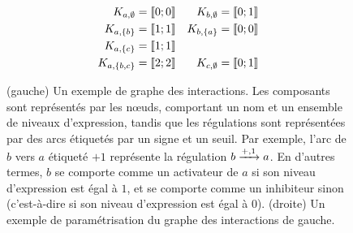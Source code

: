 \begin{figure}[ht]
  \begin{minipage}{0.5\textwidth}
  \centering
  \end{minipage}
  \begin{minipage}{0.5\textwidth}
  \centering
  \begin{align*}
    K_{a,\emptyset} &= \mathopen{\llbracket}0\mathclose{};0\mathclose{\rrbracket} & K_{b,\emptyset} &= \mathopen{\llbracket}0\mathclose{};1\mathclose{\rrbracket} \\
    K_{a,\{b\}} &= \mathopen{\llbracket}1\mathclose{};1\mathclose{\rrbracket} & K_{b,\{a\}} &= \mathopen{\llbracket}0\mathclose{};0\mathclose{\rrbracket} \\
    K_{a,\{c\}} &= \mathopen{\llbracket}1\mathclose{};1\mathclose{\rrbracket} &&\\
    K_{a,\{b,c\}} &= \mathopen{\llbracket}2\mathclose{};2\mathclose{\rrbracket} & K_{c,\emptyset} &= \mathopen{\llbracket}0\mathclose{};1\mathclose{\rrbracket}
  \end{align*}
  \end{minipage}
  \caption{%
    (gauche)
      Un exemple de graphe des interactions.
      Les composants sont représentés par les nœuds, comportant un nom et un
      ensemble de niveaux d'expression,
      tandis que les régulations sont représentées par des arcs
      étiquetés par un signe et un seuil.
      Par exemple, l'arc de $b$ vers $a$ étiqueté $+1$ représente la régulation $b \xrightarrow{+, 1} a$.
      En d'autres termes, $b$ se comporte comme un activateur de $a$ si son niveau d'expression
      est égal à $1$, et se comporte comme un inhibiteur sinon (c'est-à-dire si son niveau
      d'expression est égal à $0$).
    (droite)
      Un exemple de paramétrisation du graphe des interactions de gauche.
  }
\end{figure}

\myskip

